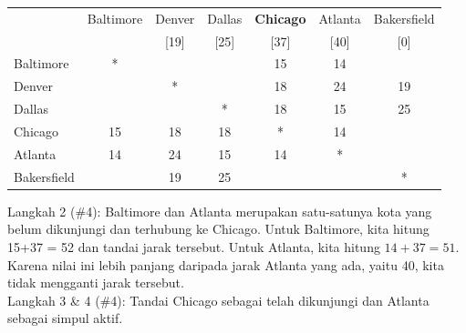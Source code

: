 \begin{example}{}
 \begin{center}
 \begin{tabular}{|l|c|c|c|c|c|c|}
 \hline
 & Baltimore & \cellcolor{yellow}Denver &  \cellcolor{yellow}Dallas & \textbf{Chicago} & Atlanta & \cellcolor{yellow}Bakersfield\\
 && \cellcolor{yellow}[19]& \cellcolor{yellow}[25]&[37]&[40]&\cellcolor{yellow}[0]\\
 \hline
 Baltimore & * & \cellcolor{yellow}& \cellcolor{yellow}&15&14&\cellcolor{yellow}\\
 \hline
 \cellcolor{yellow} Denver & \cellcolor{yellow}& \cellcolor{yellow}*& \cellcolor{yellow}& \cellcolor{yellow}18& \cellcolor{yellow}24&\cellcolor{yellow}19\\
 \hline
 \cellcolor{yellow}Dallas& \cellcolor{yellow}& \cellcolor{yellow}& \cellcolor{yellow}*& \cellcolor{yellow}18& \cellcolor{yellow}15&\cellcolor{yellow}25\\
 \hline
 Chicago &15& \cellcolor{yellow}18& \cellcolor{yellow}18&*&14&\cellcolor{yellow}\\
 \hline
 Atlanta & 14 &  \cellcolor{yellow}24& \cellcolor{yellow}15&14&*&\cellcolor{yellow}\\
 \hline
 \cellcolor{yellow}Bakersfield &\cellcolor{yellow}&\cellcolor{yellow}19&\cellcolor{yellow}25&\cellcolor{yellow}&\cellcolor{yellow}&\cellcolor{yellow}*\\
 \hline
 \end{tabular}
 \end{center}

\noindent Langkah 2 (\#4):  Baltimore dan Atlanta merupakan satu-satunya kota yang belum dikunjungi dan terhubung ke Chicago.  Untuk Baltimore, kita hitung 15+37 = 52 dan tandai jarak tersebut.  Untuk Atlanta, kita hitung $14+37 = 51$.  Karena nilai ini lebih panjang daripada jarak Atlanta yang ada, yaitu 40, kita tidak mengganti jarak tersebut.\\

\noindent Langkah 3 \& 4 (\#4):  Tandai Chicago sebagai telah dikunjungi dan Atlanta sebagai simpul aktif.


\end{example}
